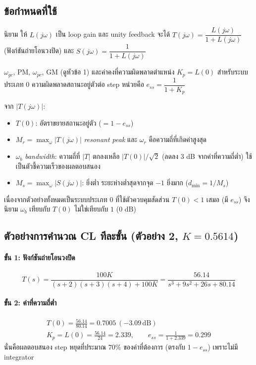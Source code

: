 \documentclass[12pt,a4paper]{article}
\newcommand{\dB}{\,\mathrm{dB}}
\newcommand{\jw}{j\omega}
\begin{document}
\subsection{ข้อกำหนดที่ใช้}
\begin{defbox}{นิยาม}
ให้ $L(\jw)$ เป็น loop gain และ unity feedback จะได้ $T(\jw)=\dfrac{L(\jw)}{1+L(\jw)}$ (ฟังก์ชันถ่ายโอนวงปิด) และ $S(\jw)=\dfrac{1}{1+L(\jw)}$
\begin{description}[leftmargin=1.2em,itemsep=2pt]
\item[วงเปิด (OL)] $\omega_{gc}$, PM, $\omega_{pc}$, GM (ดูหัวข้อ 1) และค่าคงที่ความผิดพลาดตำแหน่ง $K_p=L(0)$ สำหรับระบบประเภท 0 ความผิดพลาดสถานะอยู่ตัวต่อ step หน่วยคือ $e_{ss}=\dfrac{1}{1+K_p}$
\item[วงปิด (CL)] จาก $|T(\jw)|$:
\begin{itemize}[leftmargin=1.2em,itemsep=1pt]
\item $T(0)$: อัตราขยายสถานะอยู่ตัว ($=1-e_{ss}$)
\item $M_r=\max_{\omega}|T(\jw)|$ \emph{resonant peak} และ $\omega_r$ คือความถี่ที่เกิดค่าสูงสุด
\item $\omega_b$ \emph{bandwidth}: ความถี่ที่ $|T|$ ตกลงเหลือ $|T(0)|/\sqrt2$ (ลดลง $3$ dB จากค่าที่ความถี่ต่ำ) ใช้เป็นตัวชี้ความเร็วของผลตอบสนอง
\item $M_s=\max_{\omega}|S(\jw)|$: ยิ่งต่ำ ระยะห่างต่ำสุดจากจุด $-1$ ยิ่งมาก ($d_{\min}=1/M_s$)
\end{itemize}
\end{description}
\end{defbox}

เนื่องจากตัวอย่างทั้งหมดเป็นระบบประเภท 0 ที่ใช้ตัวควบคุมสัดส่วน $T(0)<1$ เสมอ (มี $e_{ss}$) จึงนิยาม $\omega_b$ เทียบกับ $T(0)$ ไม่ใช่เทียบกับ $1$ ($0$ dB)

\subsection{ตัวอย่างการคำนวณ CL ทีละขั้น (ตัวอย่าง 2, $K=0.5614$)}
\paragraph{ขั้น 1: ฟังก์ชันถ่ายโอนวงปิด}
\[
T(s)=\frac{100K}{(s+2)(s+3)(s+4)+100K}=\frac{56.14}{s^{3}+9s^{2}+26s+80.14}
\]

\paragraph{ขั้น 2: ค่าที่ความถี่ต่ำ}
\[
\begin{gathered}
T(0)=\frac{56.14}{80.14}=0.7005\ (-3.09\dB)\\[2pt]
K_p=L(0)=\frac{56.14}{24}=2.339,\qquad e_{ss}=\frac{1}{1+2.339}=0.299
\end{gathered}
\]
นั่นคือผลตอบสนอง step หยุดที่ประมาณ $70\%$ ของค่าที่ต้องการ (ตรงกับ $1-e_{ss}$) เพราะไม่มี integrator
\end{document}

